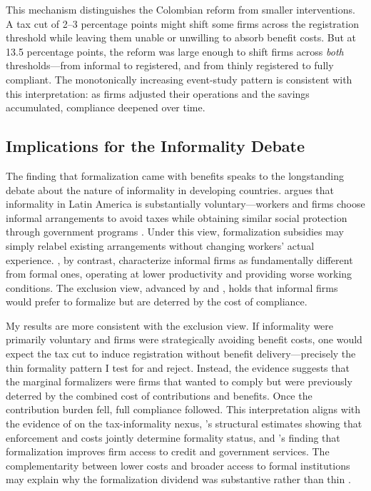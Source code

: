\documentclass[12pt]{article}
\begin{document}
This mechanism distinguishes the Colombian reform from smaller interventions. A tax cut of 2--3 percentage points might shift some firms across the registration threshold while leaving them unable or unwilling to absorb benefit costs. But at 13.5 percentage points, the reform was large enough to shift firms across \textit{both} thresholds---from informal to registered, and from thinly registered to fully compliant. The monotonically increasing event-study pattern is consistent with this interpretation: as firms adjusted their operations and the savings accumulated, compliance deepened over time.

\subsection{Implications for the Informality Debate}

The finding that formalization came with benefits speaks to the longstanding debate about the nature of informality in developing countries. \citet{levy2008good} argues that informality in Latin America is substantially voluntary---workers and firms choose informal arrangements to avoid taxes while obtaining similar social protection through government programs \citep[see also][]{maloney2004informality, levy2018informality}. Under this view, formalization subsidies may simply relabel existing arrangements without changing workers' actual experience. \citet{laporta2014informality}, by contrast, characterize informal firms as fundamentally different from formal ones, operating at lower productivity and providing worse working conditions. The exclusion view, advanced by \citet{perry2007informality} and \citet{ulyssea2018firms}, holds that informal firms would prefer to formalize but are deterred by the cost of compliance.

My results are more consistent with the exclusion view. If informality were primarily voluntary and firms were strategically avoiding benefit costs, one would expect the tax cut to induce registration without benefit delivery---precisely the thin formality pattern I test for and reject. Instead, the evidence suggests that the marginal formalizers were firms that wanted to comply but were previously deterred by the combined cost of contributions and benefits. Once the contribution burden fell, full compliance followed. This interpretation aligns with the evidence of \citet{galiani2012tax} on the tax-informality nexus, \citet{ulyssea2018firms}'s structural estimates showing that enforcement and costs jointly determine formality status, and \citet{monteiro2012coming}'s finding that formalization improves firm access to credit and government services. The complementarity between lower costs and broader access to formal institutions may explain why the formalization dividend was substantive rather than thin \citep{mckenzie2010formalize}.
\end{document}
